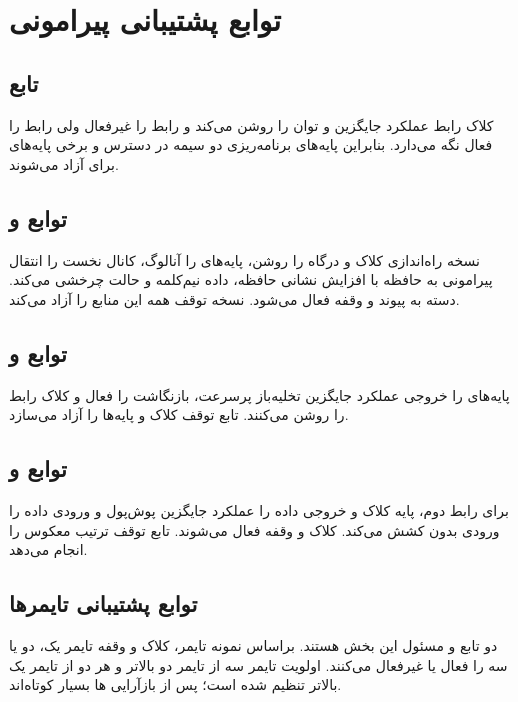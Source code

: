 \section{توابع پشتیبانی پیرامونی}

\subsection{تابع }
کلاک رابط عملکرد جایگزین و توان را روشن می‌کند و رابط
را غیرفعال ولی رابط
را فعال نگه می‌دارد. بنابراین پایه‌های برنامه‌ریزی دو سیمه در دسترس و برخی پایه‌های
برای
آزاد می‌شوند.

\subsection{توابع  و }
نسخه راه‌اندازی کلاک
و درگاه
را روشن، پایه‌های
را آنالوگ، کانال نخست
را انتقال پیرامونی به حافظه با افزایش نشانی حافظه، داده نیم‌کلمه و حالت چرخشی می‌کند. دسته
به
پیوند و وقفه فعال می‌شود. نسخه توقف همه این منابع را آزاد می‌کند.

\subsection{توابع  و }
پایه‌های
را خروجی عملکرد جایگزین تخلیه‌باز پرسرعت، بازنگاشت
را فعال و کلاک رابط را روشن می‌کنند. تابع توقف کلاک و پایه‌ها را آزاد می‌سازد.

\subsection{توابع  و }
برای رابط دوم، پایه کلاک و خروجی داده را عملکرد جایگزین پوش‌پول و ورودی داده را ورودی بدون کشش می‌کند. کلاک و وقفه
فعال می‌شوند. تابع توقف ترتیب معکوس را انجام می‌دهد.

\subsection{توابع پشتیبانی تایمرها}
دو تابع
و
مسئول این بخش هستند.
براساس نمونه تایمر، کلاک و وقفه تایمر یک، دو یا سه را فعال یا غیرفعال می‌کنند. اولویت تایمر سه از تایمر دو بالاتر و هر دو از تایمر یک بالاتر تنظیم شده است؛ پس از بازآرایی
ها
بسیار کوتاه‌اند.

